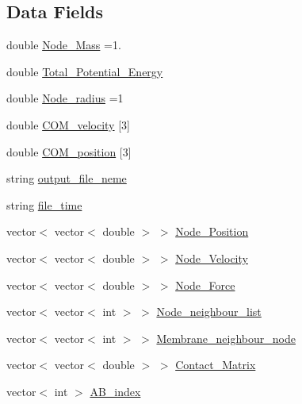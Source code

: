 \subsection*{Data Fields}
\begin{DoxyCompactItemize}
\item 
double \mbox{\hyperlink{classChromatin_a926ccfa22147b39cd04b49c2b68c07c2}{Node\+\_\+\+Mass}} =1.
\item 
double \mbox{\hyperlink{classChromatin_a6230e21b70b3d66a4108dbad1dc6298f}{Total\+\_\+\+Potential\+\_\+\+Energy}}
\item 
double \mbox{\hyperlink{classChromatin_acf302f81b89cef7cda7be41c16338867}{Node\+\_\+radius}} =1
\item 
double \mbox{\hyperlink{classChromatin_ae2f34981e33be9eb23851d9515f42b9f}{C\+O\+M\+\_\+velocity}} \mbox{[}3\mbox{]}
\item 
double \mbox{\hyperlink{classChromatin_a017fac70664bad43142caf019eb681fe}{C\+O\+M\+\_\+position}} \mbox{[}3\mbox{]}
\item 
string \mbox{\hyperlink{classChromatin_adb1e1eaa1f22fd6b84558c03bfa58328}{output\+\_\+file\+\_\+neme}}
\item 
string \mbox{\hyperlink{classChromatin_ab3ea56851de82ce78217bec9d4b7b46a}{file\+\_\+time}}
\item 
vector$<$ vector$<$ double $>$ $>$ \mbox{\hyperlink{classChromatin_ae073b0e38ca1cd23a0bb313a3651e6f5}{Node\+\_\+\+Position}}
\item 
vector$<$ vector$<$ double $>$ $>$ \mbox{\hyperlink{classChromatin_aed0728874c6204dd38e59dd6c008a160}{Node\+\_\+\+Velocity}}
\item 
vector$<$ vector$<$ double $>$ $>$ \mbox{\hyperlink{classChromatin_a263c3a9e051dea350964914691a33af7}{Node\+\_\+\+Force}}
\item 
vector$<$ vector$<$ int $>$ $>$ \mbox{\hyperlink{classChromatin_a881c463296819b2dc82e04817ae65491}{Node\+\_\+neighbour\+\_\+list}}
\item 
vector$<$ vector$<$ int $>$ $>$ \mbox{\hyperlink{classChromatin_a8530902fd510e707484abd584b1f2992}{Membrane\+\_\+neighbour\+\_\+node}}
\item 
vector$<$ vector$<$ double $>$ $>$ \mbox{\hyperlink{classChromatin_a163b690f6c7f65a466816e5356cd9038}{Contact\+\_\+\+Matrix}}
\item 
vector$<$ int $>$ \mbox{\hyperlink{classChromatin_a9ff62f8e84ca7f0bbec06f943241bba2}{A\+B\+\_\+index}}
\end{DoxyCompactItemize}


